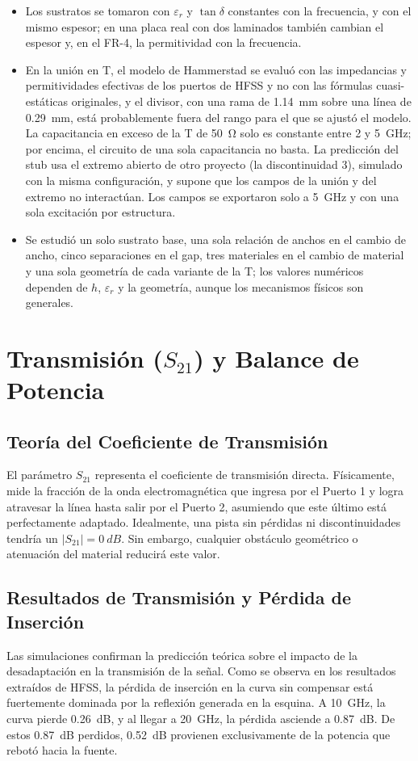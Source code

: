 \documentclass[11pt,letterpaper]{article}
\begin{document}
\begin{itemize}
\item Los sustratos se tomaron con $\varepsilon_r$ y $\tan\delta$ constantes con la frecuencia, y con el mismo espesor; en una placa real con dos laminados también cambian el espesor y, en el FR-4, la permitividad con la frecuencia.
\item En la unión en T, el modelo de Hammerstad se evaluó con las impedancias y permitividades efectivas de los puertos de HFSS y no con las fórmulas cuasi-estáticas originales, y el divisor, con una rama de \SI{1.14}{mm} sobre una línea de \SI{0.29}{mm}, está probablemente fuera del rango para el que se ajustó el modelo. La capacitancia en exceso de la T de \SI{50}{\ohm} solo es constante entre 2 y \SI{5}{GHz}; por encima, el circuito de una sola capacitancia no basta. La predicción del stub usa el extremo abierto de otro proyecto (la discontinuidad 3), simulado con la misma configuración, y supone que los campos de la unión y del extremo no interactúan. Los campos se exportaron solo a \SI{5}{GHz} y con una sola excitación por estructura.
\item Se estudió un solo sustrato base, una sola relación de anchos en el cambio de ancho, cinco separaciones en el gap, tres materiales en el cambio de material y una sola geometría de cada variante de la T; los valores numéricos dependen de $h$, $\varepsilon_r$ y la geometría, aunque los mecanismos físicos son generales.
\end{itemize}

\clearpage

\section{Transmisión ($S_{21}$) y Balance de Potencia}
\label{sec:transmision_balance}

\subsection{Teoría del Coeficiente de Transmisión}
El parámetro $S_{21}$ representa el coeficiente de transmisión directa. Físicamente, mide la fracción de la onda electromagnética que ingresa por el Puerto 1 y logra atravesar la línea hasta salir por el Puerto 2, asumiendo que este último está perfectamente adaptado. Idealmente, una pista sin pérdidas ni discontinuidades tendría un $|S_{21}| = \SI{0}{dB}$. Sin embargo, cualquier obstáculo geométrico o atenuación del material reducirá este valor.

\subsection{Resultados de Transmisión y Pérdida de Inserción}
Las simulaciones confirman la predicción teórica sobre el impacto de la desadaptación en la transmisión de la señal. Como se observa en los resultados extraídos de HFSS, la pérdida de inserción en la curva sin compensar está fuertemente dominada por la reflexión generada en la esquina. A \SI{10}{GHz}, la curva pierde \SI{0.26}{dB}, y al llegar a \SI{20}{GHz}, la pérdida asciende a \SI{0.87}{dB}. De estos \SI{0.87}{dB} perdidos, \SI{0.52}{dB} provienen exclusivamente de la potencia que rebotó hacia la fuente. 
\end{document}
